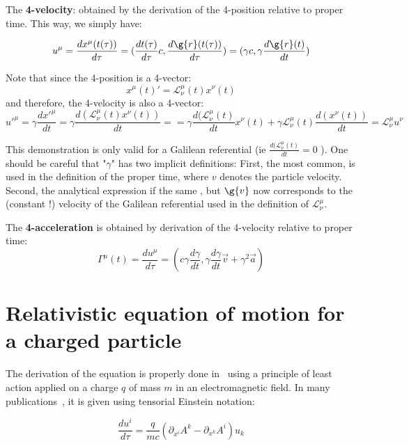 \noindent The \textbf{4-velocity}: obtained by the derivation of the 4-position relative to proper time. This way, we simply have:

$$
u^{\mu} = \frac{d x^{\mu}(t(\tau))}{d\tau} =  (\frac{dt(\tau)}{d\tau} c , \frac{d\g{r} (t(\tau))}{d\tau}) = (\gamma c , \gamma \frac{d\g{r}(t)}{dt})
$$

\noindent Note that since the 4-position is a 4-vector:
$$
x^{\mu}(t)' = \mathcal{L}^{\mu}_{\nu}(t)x^{\nu}(t)
$$
\noindent and therefore, the 4-velocity is also a 4-vector:
$$
u'^{\mu} = \gamma \frac{dx'^{\mu}}{dt} = \gamma \frac{ d (\mathcal{L}^{\mu}_{\nu}(t)x^{\nu}(t) )}{dt} = = \gamma \frac{ d (\mathcal{L}^{\mu}_{\nu}(t)}{dt} x^{\nu}(t)  +  \gamma \mathcal{L}^{\mu}_{\nu}(t) \frac{ d (x^{\nu}(t) )}{dt} = \mathcal{L}^{\mu}_{\nu} u^{\nu}
$$

\noindent This demonstration is only valid for a Galilean referential  (ie $ \frac{d (\mathcal{L}^{\mu}_{\nu}(t)}{dt} = 0$ ). 
One should be careful that "$\gamma $" has two implicit definitions: 
First, the most common, is used in the definition of the proper time, where $v$ denotes the particle velocity. 
Second,  the analytical expression if the same , but $\g{v}$ now corresponds to the (constant !) velocity of the Galilean referential used in the definition of $\mathcal{L}^{\mu}_{\nu}$.

\noindent The \textbf{4-acceleration} is obtained by derivation of the 4-velocity relative to proper time: 
$$
\Gamma^{\mu} (t) = \frac{d u^{\mu}}{d\tau} = (c\gamma \frac{d\gamma}{dt},\gamma \frac{d\gamma}{dt}\vec v + \gamma^2 \vec a)
$$


\section{Relativistic equation of motion for a charged particle}



The derivation of the equation is properly done in~\cite{LandauLip} using a principle of least action applied on a charge $q$ of mass $m$ in an electromagnetic field. In many publications~\cite{kibble1966mutual,schmidt1973relativistic}, it is given using tensorial Einstein notation:

\begin{equation}
\frac{du^i}{d\tau} = \frac{q}{mc}(\partial_{x^i}A^k - \partial_{x^k}A^i)u_k 
\end{equation}

